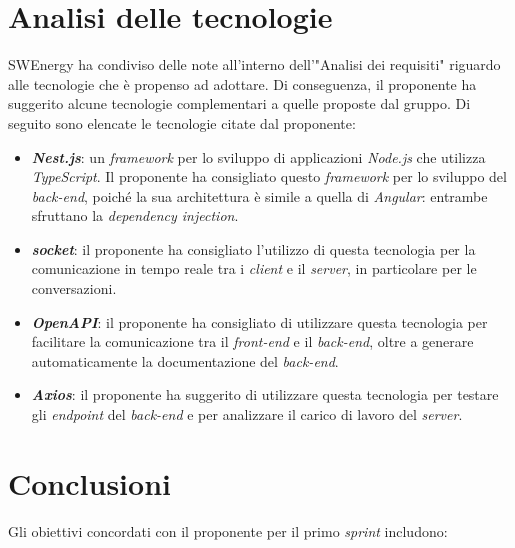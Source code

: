 \section{Analisi delle tecnologie}

SWEnergy ha condiviso delle note all'interno dell'"Analisi dei requisiti" 
riguardo alle tecnologie che è propenso ad adottare. Di conseguenza, il 
proponente ha suggerito alcune tecnologie complementari a quelle proposte dal 
gruppo. Di seguito sono elencate le tecnologie citate dal proponente:

\begin{itemize}
	\item \textbf{\textit{Nest.js}}: un \textit{framework} per lo sviluppo di 
		applicazioni \textit{Node.js} che utilizza \textit{TypeScript}. Il 
		proponente ha consigliato questo \textit{framework} per lo sviluppo del 
		\textit{back-end}, poiché la sua architettura è simile a quella di
		\textit{Angular}: entrambe sfruttano la \textit{dependency injection}.
    
    \item \textbf{\textit{socket}}: il proponente ha consigliato l'utilizzo di 
		questa tecnologia per la comunicazione in tempo reale tra i
		\textit{client} e il \textit{server}, in particolare per le
		conversazioni.
    
    \item \textbf{\textit{OpenAPI}}: il proponente ha consigliato di utilizzare 
		questa tecnologia per facilitare la comunicazione tra il
		\textit{front-end} e il \textit{back-end}, oltre a generare 
		automaticamente la documentazione del \textit{back-end}.
    
    \item \textbf{\textit{Axios}}: il proponente ha suggerito di utilizzare 
		questa tecnologia per testare gli \textit{endpoint} del 
		\textit{back-end} e per analizzare il carico di lavoro del
		\textit{server}.
\end{itemize}

\section{Conclusioni}

Gli obiettivi concordati con il proponente per il primo \textit{sprint} 
includono:

